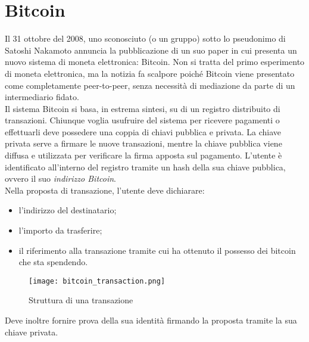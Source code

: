 \section{Bitcoin}
	Il 31 ottobre del 2008, uno sconosciuto (o un gruppo) sotto lo pseudonimo di Satoshi Nakamoto annuncia la pubblicazione di un suo paper \cite{nakamoto_bitcoin} in cui presenta un nuovo sistema di moneta elettronica: Bitcoin. Non si tratta del primo esperimento di moneta elettronica, ma la notizia fa scalpore poiché Bitcoin viene presentato come completamente peer-to-peer, senza necessità di mediazione da parte di un intermediario fidato. \\
	Il sistema Bitcoin si basa, in estrema sintesi, su di un registro distribuito di transazioni. Chiunque voglia usufruire del sistema per ricevere pagamenti o effettuarli deve possedere una coppia di chiavi pubblica e privata. La chiave privata serve a firmare le nuove transazioni, mentre la chiave pubblica viene diffusa e utilizzata per verificare la firma apposta sul pagamento. L'utente è identificato all'interno del registro tramite un hash della sua chiave pubblica, ovvero il suo \emph{indirizzo Bitcoin}. \\
	Nella proposta di transazione, l'utente deve dichiarare:
	\begin{itemize}
		\item l'indirizzo del destinatario;
		\item l'importo da trasferire;
		\item il riferimento alla transazione tramite cui ha ottenuto il possesso dei bitcoin che sta spendendo.
	\end{itemize}
	\begin{figure}[ht]
		\centering
		\texttt{[image: bitcoin\_transaction.png]}
		\caption{Struttura di una transazione}
		\label{fig:bitcoin_transaction}
	\end{figure}
	Deve inoltre fornire prova della sua identità firmando la proposta tramite la sua chiave privata.
